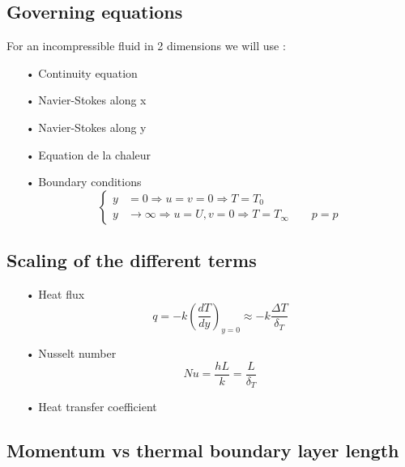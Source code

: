 \subsection{Governing equations}
	For an incompressible fluid in 2 dimensions we will use : 
	\begin{itemize}
		\item[•] Continuity equation
		\item[•] Navier-Stokes along x
		\item[•] Navier-Stokes along y
		\item[•] Equation de la chaleur
		\item[•] Boundary conditions 
			\begin{equation}
				\left\{
				\begin{aligned}
				y&= 0 \Rightarrow u = v = 0 \Rightarrow T = T_0 \\
				y &\rightarrow \infty \Rightarrow u = U, v=0 \Rightarrow T = T_\infty \qquad p = p
				\end{aligned}
				\right.	
			\end{equation}
	\end{itemize}
	
\subsection{Scaling of the different terms}
	\begin{itemize}
		\item[•] Heat flux 
			\begin{equation}
				q = -k \left( \frac{d T}{d y} \right)_{y = 0} \approx -k \frac{\Delta T}{\delta _T} 
			\end{equation}
		\item[•] Nusselt number 
			\begin{equation}
				Nu = \frac{hL}{k} = \frac{L}{\delta _T}
			\end{equation}
		\item[•] Heat transfer coefficient 
	\end{itemize}
	
\subsection{Momentum vs thermal boundary layer length}
